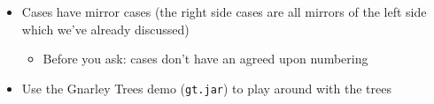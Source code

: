 \documentclass[
  10pt,
  english,
  letterpaper,
,tablecaptionabove
]{scrartcl}
\newcommand{\passthrough}[1]{#1}
\providecommand{\tightlist}{%
  \setlength{\itemsep}{0pt}\setlength{\parskip}{0pt}}
\begin{document}
\begin{itemize}
\tightlist
\item
  Cases have mirror cases (the right side cases are all mirrors of the
  left side which we've already discussed)

  \begin{itemize}
  \tightlist
  \item
    Before you ask: cases don't have an agreed upon numbering
  \end{itemize}
\item
  Use the Gnarley Trees demo (\passthrough{\lstinline!gt.jar!}) to play
  around with the trees
\end{itemize}
\end{document}
